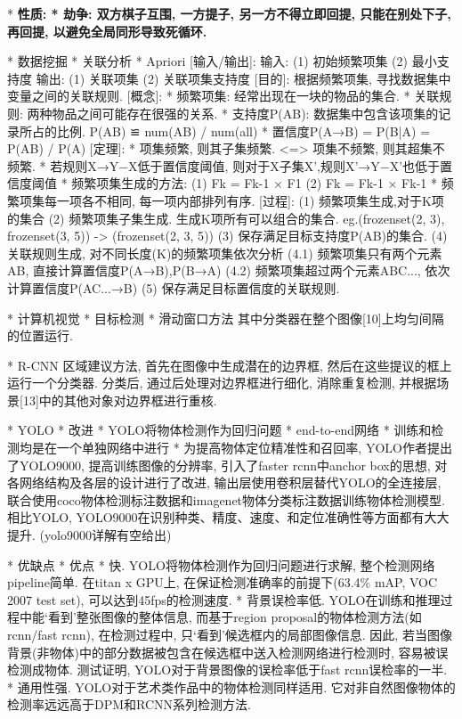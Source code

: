 {				* \bf{性质}:
					* \bf{劫争}: 双方棋子互围, 一方提子, 另一方不得立即回提, 只能在别处下子, 再回提, 以避免全局同形导致死循环.

* 数据挖掘
	* 关联分析
		* Apriori
			[输入/输出]:
				输入: (1) 初始频繁项集	(2) 最小支持度
				输出: (1) 关联项集		(2) 关联项集支持度
			[目的]: 根据频繁项集, 寻找数据集中变量之间的关联规则.
			[概念]:
				* 频繁项集: 经常出现在一块的物品的集合.
				* 关联规则: 两种物品之间可能存在很强的关系.
				* 支持度P(AB): 数据集中包含该项集的记录所占的比例. P(AB) ≌ num(AB) / num(all)
				* 置信度P(A→B) = P(B|A) = P(AB) / P(A)
			[定理]:
				* 项集频繁, 则其子集频繁. <=> 项集不频繁, 则其超集不频繁.
				* 若规则X→Y−X低于置信度阈值, 则对于X子集X',规则X'→Y−X'也低于置信度阈值
				* 频繁项集生成的方法:
					(1) Fk = Fk-1 × F1
					(2) Fk = Fk-1 × Fk-1
				* 频繁项集每一项各不相同,  每一项内部排列有序.
			[过程]:
				(1) 频繁项集生成,对于K项的集合
					(2) 频繁项集子集生成. 生成K项所有可以组合的集合. eg.(frozenset({2, 3}), frozenset({3, 5})) -> (frozenset({2, 3, 5}))
					(3) 保存满足目标支持度P(AB)的集合.
				(4)  关联规则生成, 对不同长度(K)的频繁项集依次分析
					(4.1) 频繁项集只有两个元素{AB}, 直接计算置信度P(A→B),P(B→A)
					(4.2) 频繁项集超过两个元素{ABC...}, 依次计算置信度P(AC...→B)
					(5) 保存满足目标置信度的关联规则.


					
* 计算机视觉
	* 目标检测
		* 滑动窗口方法
			其中分类器在整个图像[10]上均匀间隔的位置运行. 

		* R-CNN
			区域建议方法, 首先在图像中生成潜在的边界框, 然后在这些提议的框上运行一个分类器. 分类后, 通过后处理对边界框进行细化, 消除重复检测, 并根据场景[13]中的其他对象对边界框进行重核. 

		* YOLO
			* 改进
				* YOLO将物体检测作为回归问题
				* end-to-end网络
				* 训练和检测均是在一个单独网络中进行
				* 为提高物体定位精准性和召回率, YOLO作者提出了YOLO9000, 提高训练图像的分辨率, 引入了faster rcnn中anchor box的思想, 对各网络结构及各层的设计进行了改进, 输出层使用卷积层替代YOLO的全连接层, 联合使用coco物体检测标注数据和imagenet物体分类标注数据训练物体检测模型. 相比YOLO, YOLO9000在识别种类、精度、速度、和定位准确性等方面都有大大提升. (yolo9000详解有空给出)

			* 优缺点
				* 优点
					* 快. YOLO将物体检测作为回归问题进行求解, 整个检测网络pipeline简单. 在titan x GPU上, 在保证检测准确率的前提下(63.4\% mAP, VOC 2007 test set), 可以达到45fps的检测速度. 
					* 背景误检率低. YOLO在训练和推理过程中能‘看到’整张图像的整体信息, 而基于region proposal的物体检测方法(如rcnn/fast rcnn), 在检测过程中, 只‘看到’候选框内的局部图像信息. 因此, 若当图像背景(非物体)中的部分数据被包含在候选框中送入检测网络进行检测时, 容易被误检测成物体. 测试证明, YOLO对于背景图像的误检率低于fast rcnn误检率的一半. 
					* 通用性强. YOLO对于艺术类作品中的物体检测同样适用. 它对非自然图像物体的检测率远远高于DPM和RCNN系列检测方法. 

}
